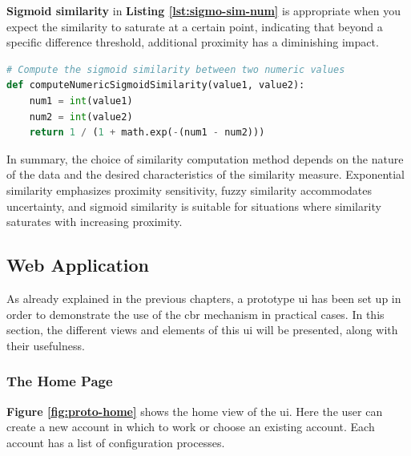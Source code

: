     
    \textbf{Sigmoid similarity} in \textbf{Listing \ref{lst:sigmo-sim-num}} is appropriate when you expect the similarity to saturate at a certain point, indicating that beyond a specific difference threshold, additional proximity has a diminishing impact.\\

\begin{lstlisting}[language=Python, caption=Function to Compute the Similarity Value Between Two Numerics using the Sigmoid Function, label={lst:sigmo-sim-num}]
# Compute the sigmoid similarity between two numeric values
def computeNumericSigmoidSimilarity(value1, value2):
    num1 = int(value1)
    num2 = int(value2)
    return 1 / (1 + math.exp(-(num1 - num2)))
\end{lstlisting}
        
In summary, the choice of similarity computation method depends on the nature of the data and the desired characteristics of the similarity measure. Exponential similarity emphasizes proximity sensitivity, fuzzy similarity accommodates uncertainty, and sigmoid similarity is suitable for situations where similarity saturates with increasing proximity.

\subsection{Web Application}
As already explained in the previous chapters, a prototype \acrshort{ui} has been set up in order to demonstrate the use of the \acrshort{cbr} mechanism in practical cases. In this section, the different views and elements of this \acrshort{ui} will be presented, along with their usefulness.

    \subsubsection{The Home Page}
    \textbf{Figure \ref{fig:proto-home}} shows the home view of the \acrshort{ui}. Here the user can create a new account in which to work or choose an existing account. Each account has a list of configuration processes.
    
